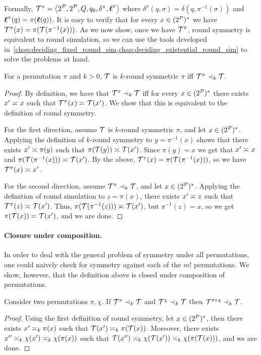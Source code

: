 Formally, $\cT^{\pi}=\tup{2^\cP,2^\cP,Q,q_0,\delta^{\pi},\lab^{\pi}}$ where $\delta^{\pi}(q,\sigma)=\delta(q,\pi^{-1}(\sigma))$ and $\lab^{\pi}(q)=\pi(\lab(q))$. It is easy to verify that for every $x\in (2^{\cP})^*$ we have $\cT^\pi(x) = \pi(\cT(\pi^{-1}(x)))$.
As we now show, once we have $\cT^\pi$, round symmetry is equivalent to round simulation, so we can use the tools developed in~\cref{chap:deciding_fixed_round_sim,chap:deciding_existential_round_sim} to solve the problems at hand.
\begin{lemma}
    \label{lem:symmetry_to_simulation}
    For a permutation $\pi$ and $k>0$, $\cT$ is $k$-round symmetric \WRT $\pi$ iff $\cT^{\pi}\prec_k \cT$.
\end{lemma}
\begin{proof}
    By definition, we have that $\cT^{\pi}\prec_{k} \cT$ iff for every $x\in (2^{\cP})^*$ there exists $x'\req x$ such that $\cT^{\pi}(x)\req \cT(x')$. We show that this is equivalent to the definition of round symmetry.
    
    For the first direction, assume $\cT$ is $k$-round symmetric \WRT $\pi$, and let $x\in (2^{\cP})^*$. Applying the definition of $k$-round symmetry to $y=\pi^{-1}(x)$ shows that there exists $x'\req \pi(y)$ such that $\pi(\cT(y))\req \cT(x')$. Since $\pi(y)=x$ we get that $x'\req x$ and $\pi(\cT(\pi^{-1}(x)))\req \cT(x')$. By the above, $\cT^\pi(x) = \pi(\cT(\pi^{-1}(x)))$, so we have $\cT^{\pi}(x)\req x'$.
    
    For the second direction, assume $\cT^\pi \prec_k \cT$, and let $x\in (2^{\cP})^*$. Applying the definition of round simulation to $z=\pi(x)$, there exists $x'\req z$ such that $\cT^{\pi}(z)\req \cT(x')$. Thus, $\pi(\cT(\pi^{-1}(z)))\req \cT(x')$, but $\pi^{-1}(z)=x$, so we get $\pi(\cT(x))\req \cT(x')$, and we are done.
\end{proof}

\paragraph*{Closure under composition.}
In order to deal with the general problem of symmetry under all permutations, one could naively check for symmetry against each of the $m!$ permutations. We show, however, that the definition above is closed under composition of permutations. 
\begin{lemma}
    \label{lem:closure_composition}
    Consider two permutations $\pi,\chi$. If $\cT^\pi\prec_k \cT$ and $\cT^\chi \prec_k \cT$ then $\cT^{\pi\circ \chi} \prec_k \cT$.
\end{lemma}
\begin{proof}
    Using the first definition of round symmetry, let $x\in (2^{\cP})^*$, then there exists $x'\req[k] \pi(x)$ such that $\cT(x')\req[k] \pi(\cT(x))$. Moreover, there exists $x''\req[k] \chi(x') \req[k] \chi(\pi(x))$ such that $\cT(x'')\req[k] \chi(\cT(x'))\req[k] \chi(\pi(\cT(x)))$, and we are done.
\end{proof}

